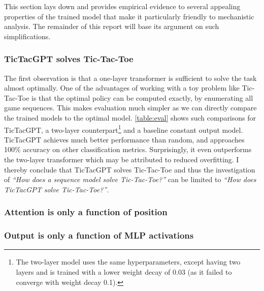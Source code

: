 \documentclass{article}
\newcommand{\ttgpt}{TicTacGPT\xspace}
\newcommand{\ttt}{Tic-Tac-Toe\xspace}
\newcounter{num}
\begin{document}


This section lays down and provides empirical evidence to several appealing properties of the trained model that make it particularly friendly to mechanistic analysis. The remainder of this report will base its argument on such simplifications.

\subsubsection{\ttgpt solves \ttt}

The first observation is that a one-layer transformer is sufficient to solve the task almost optimally. One of the advantages of working with a toy problem like \ttt is that the optimal policy can be computed exactly, by enumerating all game sequences. This makes evaluation much simpler as we can directly compare the trained models to the optimal model. \cref{table:eval} shows such comparisons for \ttgpt, a two-layer counterpart\footnote{The two-layer model uses the same hyperparameters, except having two layers and is trained with a lower weight decay of 0.03 (as it failed to converge with weight decay 0.1).} and a baseline constant output model. \ttgpt achieves much better performance than random, and approaches 100\% accuracy on other classification metrics. Surprisingly, it even outperforms the two-layer transformer which may be attributed to reduced overfitting. I thereby conclude that \ttgpt solves \ttt and thus the investigation of \emph{``How does a sequence model solve \ttt?''} can be limited to \emph{``How does \ttgpt solve \ttt?''}.

\subsubsection{Attention is only a function of position}

\subsubsection{Output is only a function of MLP activations}


\end{document}
